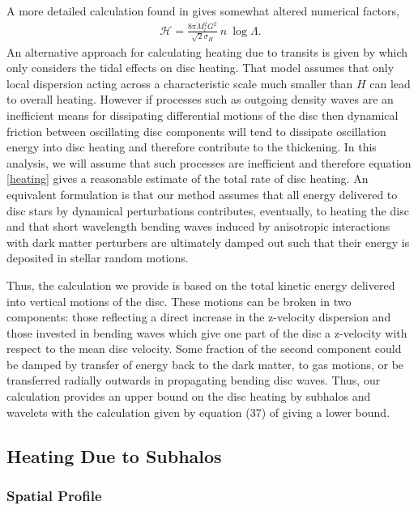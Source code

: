 \documentclass[usenatbib]{mnras}
\begin{document}
A more detailed calculation found in \cite{milkywayblackholes} gives somewhat altered numerical factors,
\begin{align} \label{heating}
\mathcal{H} = \frac{8 \pi M_l^2 G^2}{\sqrt{2} \sigma_H} \: n \: \log{\Lambda}.
\end{align}
An alternative approach for calculating heating due to transits is given by \cite{ultralight} which only considers the tidal effects on disc heating. That model assumes that only local dispersion acting across a characteristic scale much smaller than $H$ can lead to overall heating. However if processes such as outgoing density waves are an inefficient means for dissipating differential motions of the disc then dynamical friction between oscillating disc components will tend to dissipate oscillation energy into disc heating and therefore contribute to the thickening. In this analysis, we will assume that such processes are inefficient and therefore equation \eqref{heating} gives a reasonable estimate of the total rate of disc heating. {\color{magenta} An equivalent formulation is that our method assumes that all energy delivered to disc stars by dynamical perturbations contributes, eventually, to heating the disc and that short wavelength bending waves induced by anisotropic interactions with dark matter perturbers are ultimately damped out such that their energy is deposited in stellar random motions.} 

\par
    
{\color{magenta} Thus, the} calculation we provide is based on the total kinetic energy delivered into vertical motions of the disc. These motions can be broken in two components: those reflecting a direct increase in the z-velocity dispersion and those invested in bending waves which give one part of the disc a z-velocity with respect to the mean disc velocity. Some fraction of the second component could be damped by transfer of energy back to the dark matter, to gas motions, or be transferred radially outwards in propagating bending disc waves. Thus, our calculation provides an upper bound on the disc heating by subhalos and wavelets with the calculation given by equation (37) of \cite{ultralight} giving a lower bound. 
     
\subsection{Heating Due to Subhalos}
\subsubsection{Spatial Profile}
\end{document}
